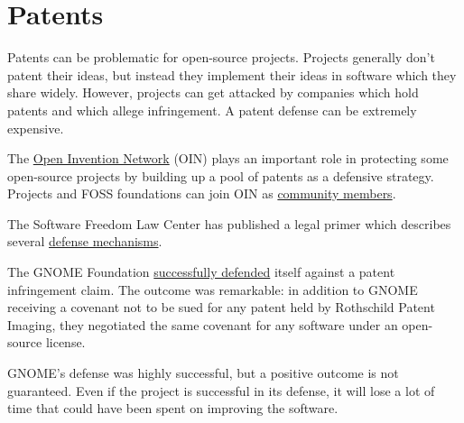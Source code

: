


\chapter{Patents}

Patents can be problematic for open-source projects.  Projects generally don't patent their ideas, but instead they implement their ideas in software which they share widely.  However, projects can get attacked by companies which hold patents and which allege infringement.  A patent defense can be extremely expensive.

The \href{https://openinventionnetwork.com/}{Open Invention Network} (OIN) plays an important role in protecting some open-source projects by building up a pool of patents as a defensive strategy.  Projects and FOSS foundations can join OIN as \href{https://openinventionnetwork.com/our-members/community-members/}{community members}.

The Software Freedom Law Center has published a legal primer which describes several \href{http://www.softwarefreedom.org/resources/2008/foss-primer.html#x1-390004}{defense mechanisms}.

\begin{kaobox}[frametitle=Patent case against GNOME]

The GNOME Foundation \href{https://foundation.gnome.org/2020/05/20/patent-case-against-gnome-resolved/}{successfully defended} itself against a patent infringement claim.  The outcome was remarkable: in addition to GNOME receiving a covenant not to be sued for any patent held by Rothschild Patent Imaging, they negotiated the same covenant for any software under an open-source license.

GNOME's defense was highly successful, but a positive outcome is not guaranteed.  Even if the project is successful in its defense, it will lose a lot of time that could have been spent on improving the software.

\end{kaobox}

